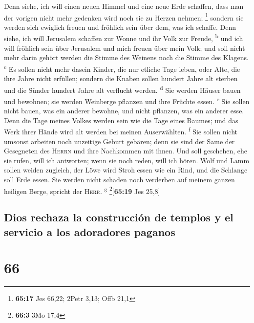  Denn siehe, ich will einen neuen Himmel und eine neue
Erde schaffen, dass man der vorigen nicht mehr gedenken wird noch sie zu
Herzen nehmen; \footnote{\textbf{65:17} Jes 66,22; 2Petr 3,13; Offb 21,1}
 sondern sie werden sich ewiglich freuen und fröhlich
sein über dem, was ich schaffe. Denn siehe, ich will Jerusalem schaffen
zur Wonne und ihr Volk zur Freude, \textsuperscript{b} 
und ich will fröhlich sein über Jerusalem und mich freuen über mein
Volk; und soll nicht mehr darin gehört werden die Stimme des Weinens
noch die Stimme des Klagens. \textsuperscript{c}  Es
sollen nicht mehr dasein Kinder, die nur etliche Tage leben, oder Alte,
die ihre Jahre nicht erfüllen; sondern die Knaben sollen hundert Jahre
alt sterben und die Sünder hundert Jahre alt verflucht werden.
\textsuperscript{d}  Sie werden Häuser bauen und
bewohnen; sie werden Weinberge pflanzen und ihre Früchte essen.
\textsuperscript{e}  Sie sollen nicht bauen, was ein
anderer bewohne, und nicht pflanzen, was ein anderer esse. Denn die Tage
meines Volkes werden sein wie die Tage eines Baumes; und das Werk ihrer
Hände wird alt werden bei meinen Auserwählten. \textsuperscript{f}
 Sie sollen nicht umsonst arbeiten noch unzeitige Geburt
gebären; denn sie sind der Same der Gesegneten des \textsc{Herrn} und
ihre Nachkommen mit ihnen.  Und soll geschehen, ehe sie
rufen, will ich antworten; wenn sie noch reden, will ich hören.
 Wolf und Lamm sollen weiden zugleich, der Löwe wird
Stroh essen wie ein Rind, und die Schlange soll Erde essen. Sie werden
nicht schaden noch verderben auf meinem ganzen heiligen Berge, spricht
der \textsc{Herr}. \textsuperscript{g} \footnote{\textbf{66:3} 3Mo 17,4}{[}\textbf{65:19}
Jes 25,8{]}

\hypertarget{dios-rechaza-la-construcciuxf3n-de-templos-y-el-servicio-a-los-adoradores-paganos}{%
\subsection{Dios rechaza la construcción de templos y el servicio a los
adoradores
paganos}\label{dios-rechaza-la-construcciuxf3n-de-templos-y-el-servicio-a-los-adoradores-paganos}}

\hypertarget{section-65}{%
\section{66}\label{section-65}}


